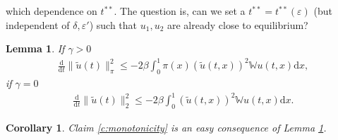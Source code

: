 \documentclass{article}
\renewcommand{\d}{\mathrm{d}}
\newcommand{\W}{\mathbb{W}}
\newcommand{\1}[1]{{\mathds{1}}_{\left\{#1\right\}}}
\newtheorem{lemma}{Lemma}
\newtheorem{corollary}{Corollary}
\begin{document}
which dependence on $t^{**}$. 
The question is, can we set a $t^{**}=t^{**}(\varepsilon)$ (but independent of $\delta,\varepsilon'$) such that $u_1,u_2$ are already close to equilibrium?

\begin{lemma}
\label{l:convergence_to_equilibrium}
If $\gamma>0$
\begin{align}
\label{eq:convergence_to_equilibrium}
\frac{\d}{\d t} \| \tilde{u}(t) \|_\pi^2 \leq -2\beta \int_{0}^{1} \pi(x) \left( \tilde{u}(t,x) \right)^2 \W u(t,x) \d x,
\end{align}
if $\gamma=0$
\begin{align}
	\label{eq:convergence_to_equilibrium'}
	\frac{\d}{\d t} \| \tilde{u}(t) \|_2^2 \leq -2\beta \int_{0}^{1}  \left( \tilde{u}(t,x) \right)^2 \W u(t,x) \d x.
\end{align}
\end{lemma}

\begin{corollary}
	Claim \ref{c:monotonicity}  is an easy consequence of Lemma \ref{l:convergence_to_equilibrium}. 
\end{corollary}
\end{document}
